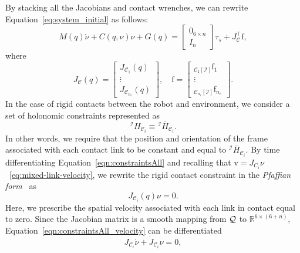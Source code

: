 By stacking all the Jacobians and contact wrenches, we can rewrite Equation~\eqref{eq:system_initial} as follows:
\begin{equation}
\label{eq:system}
{M}({q})\dot{{\nu}} + {C}({q}, {\nu}){\nu} + {G}({q}) =  \begin{bmatrix}
{0}_{6\times n} \\ I_n
\end{bmatrix}{\tau}_s + {J}_{\mathcal{C}}^\top \mathrm{f},
\end{equation}
where
\begin{equation}
	{J}_{\mathcal{C}}({q}) = 
	\begin{bmatrix}{J}_{\mathcal{C}_1}({q}) \\ \vdots \\ {J}_{\mathcal{C}_{n_c}}({q})  \end{bmatrix}, \quad
	\mathrm{f} = \begin{bmatrix}
		{}_{\mathcal{C}_1[\mathcal{I}]}\mathrm{f}_1 \\
		\vdots\\
		{}_{\mathcal{C}_{n_c}[\mathcal{I}]}\mathrm{f}_{n_c}
	\end{bmatrix}.
\end{equation}
In the case of rigid contacts between the robot and environment, we consider a set of holonomic constraints represented as
\begin{equation}\label{eqn:constraintsAll}
{}^\mathcal{I} H _{\mathcal{C}_{i}} \equiv {}^\mathcal{I} \bar{H} _{\mathcal{C}_{i}}.
\end{equation}
In other words, we require that the position and orientation of the frame associated with each contact link to be constant and equal to ${}^\mathcal{I} \bar{H} _{\mathcal{C}_{i}}$.
By time differentiating Equation~\eqref{eqn:constraintsAll} and recalling that $\mathrm{v} = J_{C_i} \nu$~\eqref{eq:mixed-link-velocity}, we rewrite the rigid contact constraint in the \emph{Pfaffian form}~\citep[Section~8.7]{Lynch2017ModernControl} as
\begin{equation}
\label{eqn:constraintsAll_velocity}
    {J}_{\mathcal{C}_i}(q) {\nu} = 0.
\end{equation}
Here, we prescribe the spatial velocity associated with each link in contact equal to zero. Since the Jacobian matrix is a smooth mapping from $\mathcal{Q}$ to $\mathbb{R}^{6\times (6 + n)}$, Equation~\eqref{eqn:constraintsAll_velocity} can be differentiated
\begin{equation}\label{eq:holonomic_constraint}
	{J}_{\mathcal{C}_i} \dot{{\nu}} + \dot{{J}}_{\mathcal{C}_i} {\nu} = 0,
\end{equation}

